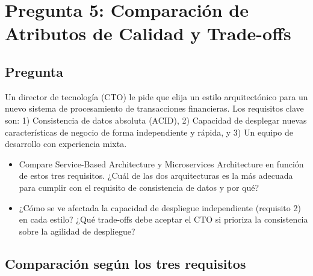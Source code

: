 \documentclass[12pt, a4paper]{article}
\begin{document}
    \section[Comparación de Atributos de Calidad y Trade-offs]{Pregunta 5: Comparación de Atributos de Calidad y Trade-offs}
    \subsection{Pregunta}

    Un director de tecnología (CTO) le pide que elija un estilo arquitectónico para un nuevo sistema de procesamiento de transacciones financieras. Los requisitos clave son: 1) Consistencia de datos absoluta (ACID), 2) Capacidad de desplegar nuevas características de negocio de forma independiente y rápida, y 3) Un equipo de desarrollo con experiencia mixta.

    \begin{itemize}
        \item Compare Service-Based Architecture y Microservices Architecture en función de estos tres requisitos. ¿Cuál de las dos arquitecturas es la más adecuada para cumplir con el requisito de consistencia de datos y por qué?
        \item ¿Cómo se ve afectada la capacidad de despliegue independiente (requisito 2) en cada estilo? ¿Qué trade-offs debe aceptar el CTO si prioriza la consistencia sobre la agilidad de despliegue?
    \end{itemize}

    \subsection{Comparación según los tres requisitos}
\end{document}
